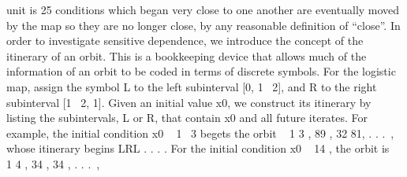 \documentclass{article}
\begin{document}
unit is 25%
conditions which began very close to one another are eventually moved by the
map so they are no longer close, by any reasonable definition of “close”.
In order to investigate sensitive dependence, we introduce the concept of
the itinerary of an orbit. This is a bookkeeping device that allows much of the
information of an orbit to be coded in terms of discrete symbols.
For the logistic map, assign the symbol L to the left subinterval [0, 1  2],
and R to the right subinterval [1  2, 1]. Given an initial value x0, we construct its
itinerary by listing the subintervals, L or R, that contain x0 and all future iterates.
For example, the initial condition x0   1  3 begets the orbit   1
3 , 89
, 32
81, . . . , whose
itinerary begins LRL . . . . For the initial condition x0   14
, the orbit is   1
4 , 34
, 34
, . . . ,
\end{document}
